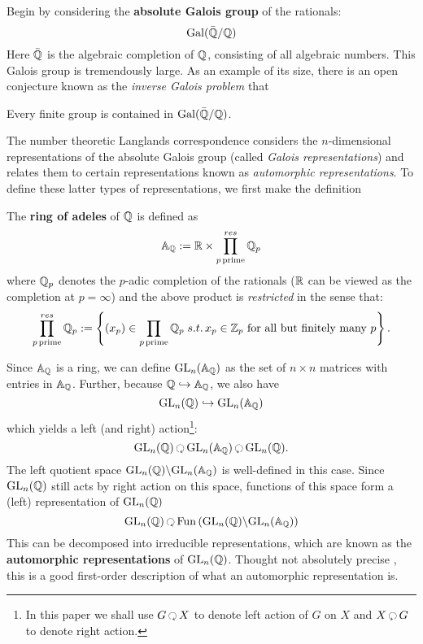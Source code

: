 Begin by considering the \textbf{absolute Galois group} of the rationals:
\[
	\mathrm{Gal}(\bar {\mathbb{Q}}/\mathbb{Q})
\]
Here $\bar {\mathbb{Q}}$ is the algebraic completion of $\mathbb{Q}$, consisting of all algebraic numbers. This Galois group is tremendously large. As an example of its size, there is an open conjecture known as the \emph{inverse Galois problem} that 
\begin{conj}
	Every finite group is contained in $\mathrm{Gal}(\bar {\mathbb{Q}}/\mathbb{Q})$.
\end{conj}
The number theoretic Langlands correspondence considers the $n$-dimensional representations of the absolute Galois group (called \emph{Galois representations}) and relates them to certain representations known as \emph{automorphic representations}. To define these latter types of representations, we first make the definition
\begin{defn}
	The \textbf{ring of adeles} of $\mathbb{Q}$ is defined as 
	\[
		\mathbb A_{\mathbb{Q}} := \mathbb{R} \times \prod_{p\, \mathrm{prime}}^{res} \mathbb{Q}_p
	\]
	where $\mathbb{Q}_p$ denotes the $p$-adic completion of the rationals \cite{bachman1964} ($\mathbb{R}$ can be viewed as the completion at $p=\infty$) and the above product is \emph{restricted} in the sense that:
	\[
		\prod_{p\, \mathrm{prime}}^{res} \mathbb{Q}_p := \left\{ (x_p) \in \prod_{p\, \mathrm{prime}} \mathbb{Q}_p \; s.t. \, x_p \in \mathbb Z_p \text{ for all but finitely many } p\right\}.
	\]
\end{defn}

Since $\mathbb A_{\mathbb{Q}}$ is a ring, we can define $\mathrm{GL}_n(\mathbb A_{\mathbb{Q}})$ as the set of $n \times n$ matrices with entries in $\mathbb A_{\mathbb{Q}}$. Further, because $\mathbb{Q} \hookrightarrow \mathbb A_{\mathbb{Q}}$, we also have 
\[
	\mathrm{GL}_n(\mathbb{Q}) \hookrightarrow \mathrm{GL}_n(\mathbb A_{\mathbb{Q}})
\]
which yields a left (and right) action\footnote{In this paper we shall use $G\lacts X$ to denote left action of $G$ on $X$ and $X \racts G$ to denote right action.}:
\[
	\GL_n(\qq) \lacts  \GL_n(\mathbb A_\qq) \racts  \GL_n(\qq).
\]
The left quotient space $\mathrm{GL}_n(\mathbb{Q}) \backslash \mathrm{GL}_n(\mathbb A_{\mathbb{Q}})$ is well-defined in this case. Since $\mathrm{GL}_n(\mathbb{Q})$ still acts by right action on this space, functions of this space form a (left) representation of $\mathrm{GL}_n(\mathbb{Q})$
\[
	\GL_n(\qq) \lacts \mathrm{Fun}\left( \GL_n(\qq) \backslash \GL_n(\mathbb A_\qq) \right)
\]
This can be decomposed into irreducible representations, which are known as the \textbf{automorphic representations} of $\mathrm{GL}_n(\mathbb{Q})$.
Thought not absolutely precise \cite{Yoo18}, this is a good first-order description of what an automorphic representation is. 

